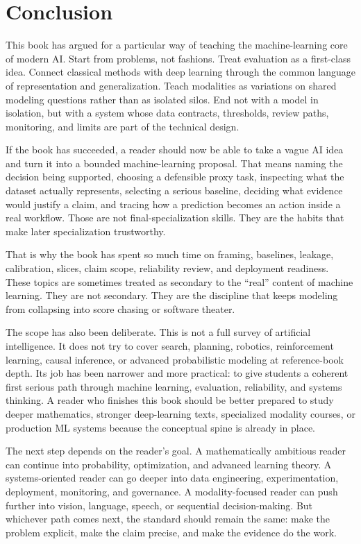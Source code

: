\chapter*{Conclusion}

This book has argued for a particular way of teaching the machine-learning core of modern AI. Start from problems, not fashions. Treat evaluation as a first-class idea. Connect classical methods with deep learning through the common language of representation and generalization. Teach modalities as variations on shared modeling questions rather than as isolated silos. End not with a model in isolation, but with a system whose data contracts, thresholds, review paths, monitoring, and limits are part of the technical design.

If the book has succeeded, a reader should now be able to take a vague AI idea and turn it into a bounded machine-learning proposal. That means naming the decision being supported, choosing a defensible proxy task, inspecting what the dataset actually represents, selecting a serious baseline, deciding what evidence would justify a claim, and tracing how a prediction becomes an action inside a real workflow. Those are not final-specialization skills. They are the habits that make later specialization trustworthy.

That is why the book has spent so much time on framing, baselines, leakage, calibration, slices, claim scope, reliability review, and deployment readiness. These topics are sometimes treated as secondary to the ``real'' content of machine learning. They are not secondary. They are the discipline that keeps modeling from collapsing into score chasing or software theater.

The scope has also been deliberate. This is not a full survey of artificial intelligence. It does not try to cover search, planning, robotics, reinforcement learning, causal inference, or advanced probabilistic modeling at reference-book depth. Its job has been narrower and more practical: to give students a coherent first serious path through machine learning, evaluation, reliability, and systems thinking. A reader who finishes this book should be better prepared to study deeper mathematics, stronger deep-learning texts, specialized modality courses, or production ML systems because the conceptual spine is already in place.

The next step depends on the reader's goal. A mathematically ambitious reader can continue into probability, optimization, and advanced learning theory. A systems-oriented reader can go deeper into data engineering, experimentation, deployment, monitoring, and governance. A modality-focused reader can push further into vision, language, speech, or sequential decision-making. But whichever path comes next, the standard should remain the same: make the problem explicit, make the claim precise, and make the evidence do the work.

